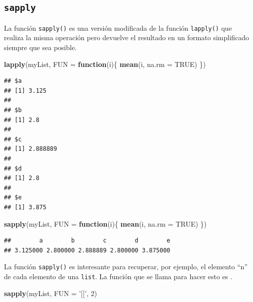 \documentclass[
]{book}
\newenvironment{Shaded}{\begin{snugshade}}{\end{snugshade}}
\newcommand{\ControlFlowTok}[1]{\textcolor[rgb]{0.13,0.29,0.53}{\textbf{#1}}}
\newcommand{\DataTypeTok}[1]{\textcolor[rgb]{0.13,0.29,0.53}{#1}}
\newcommand{\DecValTok}[1]{\textcolor[rgb]{0.00,0.00,0.81}{#1}}
\newcommand{\KeywordTok}[1]{\textcolor[rgb]{0.13,0.29,0.53}{\textbf{#1}}}
\newcommand{\NormalTok}[1]{#1}
\newcommand{\OtherTok}[1]{\textcolor[rgb]{0.56,0.35,0.01}{#1}}
\newcommand{\StringTok}[1]{\textcolor[rgb]{0.31,0.60,0.02}{#1}}
\begin{document}
\hypertarget{l17lapply}{%
\subsection{\texorpdfstring{\texttt{sapply}}{sapply}}\label{l17lapply}}

La función \texttt{sapply()} es una versión modificada de la función \texttt{lapply()} que realiza la misma operación pero devuelve el resultado en un formato simplificado siempre que sea posible.

\begin{Shaded}
\begin{Highlighting}[]
\KeywordTok{lapply}\NormalTok{(myList, }\DataTypeTok{FUN =} \ControlFlowTok{function}\NormalTok{(i)\{}
  \KeywordTok{mean}\NormalTok{(i, }\DataTypeTok{na.rm =} \OtherTok{TRUE}\NormalTok{)}
\NormalTok{\})}
\end{Highlighting}
\end{Shaded}

\begin{verbatim}
## $a
## [1] 3.125
## 
## $b
## [1] 2.8
## 
## $c
## [1] 2.888889
## 
## $d
## [1] 2.8
## 
## $e
## [1] 3.875
\end{verbatim}

\begin{Shaded}
\begin{Highlighting}[]
\KeywordTok{sapply}\NormalTok{(myList, }\DataTypeTok{FUN =} \ControlFlowTok{function}\NormalTok{(i)\{}
  \KeywordTok{mean}\NormalTok{(i, }\DataTypeTok{na.rm =} \OtherTok{TRUE}\NormalTok{)}
\NormalTok{\})}
\end{Highlighting}
\end{Shaded}

\begin{verbatim}
##        a        b        c        d        e 
## 3.125000 2.800000 2.888889 2.800000 3.875000
\end{verbatim}

La función \texttt{sapply()} es interesante para recuperar, por ejemplo, el elemento ``n'' de cada elemento de una \texttt{list}. La función que se llama para hacer esto es \texttt{\textquotesingle{}{[}{[}\textquotesingle{}}.

\begin{Shaded}
\begin{Highlighting}[]
\KeywordTok{sapply}\NormalTok{(myList, }\DataTypeTok{FUN =} \StringTok{'[['}\NormalTok{, }\DecValTok{2}\NormalTok{)}
\end{Highlighting}
\end{Shaded}
\end{document}
